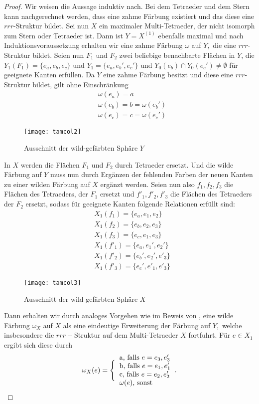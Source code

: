 \documentclass[12pt,titlepage,twoside,cleardoublepage]{article}
\theoremstyle{nummermitklammern}
\numberwithin{equation}{section}
\begin{document}
\begin{proof}
Wir weisen die Aussage induktiv nach. Bei dem Tetraeder und dem Stern kann nachgerechnet werden, dass eine zahme Färbung existiert und das diese eine $rrr$-Struktur bildet. Sei nun $X$ ein maximaler Multi-Tetraeder, der nicht isomorph zum Stern oder Tetraeder ist.
 Dann ist $Y=X^{(1)}$ ebenfalls maximal und nach Induktionsvoraussetzung erhalten wir eine zahme Färbung $\omega$ auf $Y,$ die eine $rrr$-Struktur bildet. Seien nun $F_1$ und $F_2$ zwei beliebige benachbarte Flächen in $Y$, die $Y_1(F_1)=\{e_a,e_b,e_c\}$ und $Y_1=\{e_a,e_b',e_c'\}$ und $Y_0(e_b)\cap Y_0(e_c')\neq \emptyset$ für geeignete Kanten erfüllen.
Da $Y$ eine zahme Färbung besitzt und diese eine $rrr$-Struktur bildet, gilt ohne Einschränkung
\begin{align*}
&\omega(e_a)=a\\
&\omega(e_b)=b=\omega(e_b')\\
&\omega(e_c)=c=\omega(e_c')
\end{align*}
\begin{figure}[H]
\begin{center}
\texttt{[image: tamcol2]}
\end{center}
\caption{Ausschnitt der wild-gefärbten Sphäre $Y$}
\end{figure}
In $X$ werden die Flächen $F_1$ und $F_2$ durch Tetraeder ersetzt. Und die wilde Färbung auf $Y$ muss nun durch Ergänzen der fehlenden Farben der neuen Kanten zu einer wilden Färbung auf $X$ ergänzt werden. Seien nun also $f_1,f_2,f_3$ die Flächen des Tetraeders, der $F_1$ ersetzt und $f'_1,f'_2,f'_3$ die Flächen des Tetraeders der $F_2$ ersetzt, sodass für geeignete Kanten folgende Relationen erfüllt sind:
\begin{align*}
&X_1(f_1)=\{e_a,e_1,e_2\}\\
&X_1(f_2)=\{e_b,e_2,e_3\}\\
&X_1(f_3)=\{e_c,e_1,e_3\}\\
&X_1(f'_1)=\{e_a,e_1',e_2'\}\\
&X_1(f'_2)=\{e_b',e_2',e'_3\}\\
&X_1(f'_3)=\{e_c',e'_1,e'_3\}
\end{align*}
\begin{figure}[H]
\begin{center}
\texttt{[image: tamcol3]}
\end{center}
\caption{Ausschnitt der wild-gefärbten Sphäre $X$}
\end{figure}
Dann erhalten wir durch analoges Vorgehen wie im Beweis von , eine wilde Färbung $\omega_X$ auf $X$ als eine eindeutige Erweiterung der Färbung auf $Y,$ welche insbesondere die $rrr-$Struktur auf dem Multi-Tetraeder $X$ fortfuhrt. Für $e\in X_1$ ergibt sich diese durch 
\begin{align*}
\omega_X(e)=\Biggl\{\begin{tabular}[l]{lcr}
a, falls $e=e_3,e_3'$\\
b, falls $e=e_1,e_1'$\\
c, falls $e=e_2,e_2'$\\
$\omega(e)$, sonst
\end{tabular}.
\end{align*}


\end{proof}
\end{document}

